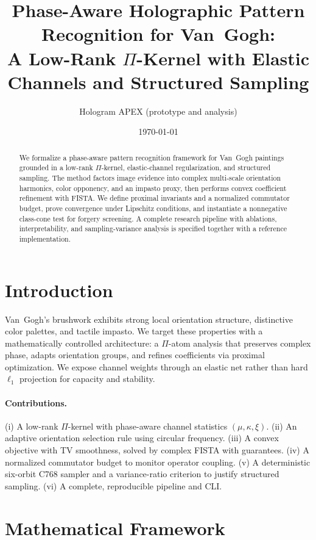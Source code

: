 \documentclass[11pt]{article}
\title{Phase-Aware Holographic Pattern Recognition for Van~Gogh:\\ A Low-Rank \texorpdfstring{$\Pi$}{Pi}-Kernel with Elastic Channels and Structured Sampling}
\author{Hologram APEX \;\; (prototype and analysis)}
\date{\today}
\begin{document}
\maketitle

\begin{abstract}
We formalize a phase-aware pattern recognition framework for Van~Gogh paintings grounded in a low-rank $\Pi$-kernel, elastic-channel regularization, and structured sampling. The method factors image evidence into complex multi-scale orientation harmonics, color opponency, and an impasto proxy, then performs convex coefficient refinement with FISTA. We define proximal invariants and a normalized commutator budget, prove convergence under Lipschitz conditions, and instantiate a nonnegative class-cone test for forgery screening. A complete research pipeline with ablations, interpretability, and sampling-variance analysis is specified together with a reference implementation.
\end{abstract}

\section{Introduction}
Van~Gogh's brushwork exhibits strong local orientation structure, distinctive color palettes, and tactile impasto. We target these properties with a mathematically controlled architecture: a $\Pi$-atom analysis that preserves complex phase, adapts orientation groups, and refines coefficients via proximal optimization. We expose channel weights through an elastic net rather than hard $\ell_1$ projection for capacity and stability.

\paragraph{Contributions.} (i) A low-rank $\Pi$-kernel with phase-aware channel statistics $(\mu,\kappa,\xi)$. (ii) An adaptive orientation selection rule using circular frequency. (iii) A convex objective with TV smoothness, solved by complex FISTA with guarantees. (iv) A normalized commutator budget to monitor operator coupling. (v) A deterministic six-orbit C768 sampler and a variance-ratio criterion to justify structured sampling. (vi) A complete, reproducible pipeline and CLI.

\section{Mathematical Framework}
\end{document}

